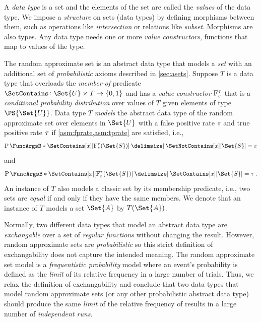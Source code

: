 \documentclass[10pt,final,hidelinks]{article}
\numberwithin{equation}{section}
\begin{document}
A \emph{data type} is a set and the elements of the set are called the \emph{values} of the data type.
We impose a \emph{structure} on sets (data types) by defining morphisms between them, such as operations like \emph{intersection} or relations like \emph{subset}.
Morphisms are also types.
Any data type needs one or more \emph{value constructors}, functions that map to values of the type.


The random approximate set is an abstract data type that models a \emph{set} with an additional set of \emph{probabilistic} axioms described in \cref{sec:asets}.
Suppose $T$ is a data type that overloads the \emph{member-of} predicate $\SetContains \colon \Set{U} \times T \mapsto \{0,1\}$ and has a \emph{value constructor} $\ctor{\fprate}{\tprate}$ that is a \emph{conditional probability distribution} over values of $T$ given elements of type $\PS{\Set{U}}$.
Data type $T$ \emph{models} the abstract data type of the random approximate set over elements in $\Set{U}$ with a false positive rate $\varepsilon$ and true positive rate $\tau$ if \cref{asm:fprate,asm:tprate} are satisfied, i.e.,
\begin{equation}
	\Prob{\SetContains[x][\ctor{\fprate}{\tprate}(\Set{S})] \Given \SetNotContains[x][\Set{S}]} = \fprate
\end{equation}
and
\begin{equation}
	\Prob{\SetContains[x][\ctor{\fprate}{\tprate}(\Set{S})] \Given \SetContains[x][\Set{S}]} = \tprate\,.
\end{equation}
An instance of $T$ also models a classic set by its membership predicate, i.e., two sets are \emph{equal} if and only if they have the same members. We denote that an instance of $T$ models a set $\Set{A}$ by $T(\Set{A})$.

Normally, two different data types that model an abstract data type are \emph{exchangable} over a set of \emph{regular functions} without changing the result.
However, random approximate sets are \emph{probabilistic} so this strict definition of exchangability does not capture the intended meaning.
The random approximate set model is a \emph{frequentistic probability} model where an event's probability is defined as the \emph{limit} of its relative frequency in a large number of trials.
Thus, we relax the definition of exchangability and conclude that two data types that model random approximate sets (or any other probabilistic abstract data type) should produce the same \emph{limit} of the relative frequency of results in a large number of \emph{independent runs}.
\end{document}
